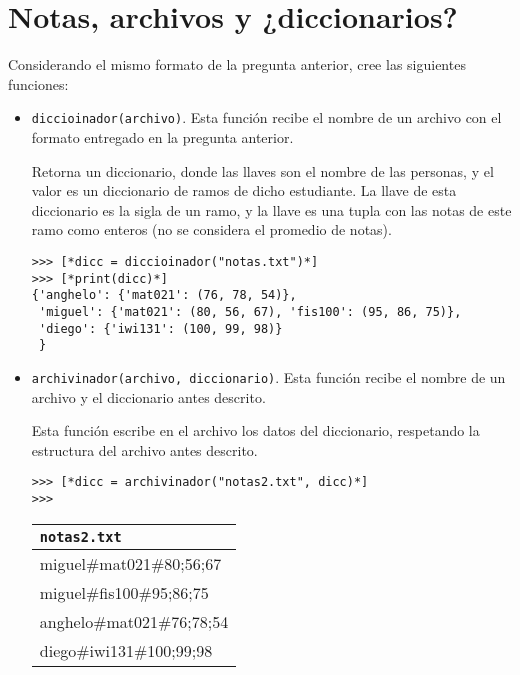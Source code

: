 \section{Notas, archivos y ¿diccionarios?}

Considerando el mismo formato de la pregunta anterior, cree las siguientes funciones:

\begin{itemize}
    \item \texttt{diccioinador(archivo)}. Esta función recibe el nombre de un archivo con el formato entregado en la pregunta anterior. 
    
    Retorna un diccionario, donde las llaves son el nombre de las personas, y el valor es un diccionario de ramos de dicho estudiante. La llave de esta diccionario es la sigla de un ramo, y la llave es una tupla con las notas de este ramo como enteros (no se considera el promedio de notas).
    
    \begin{lstlisting}[style=consola]
>>> [*dicc = diccioinador("notas.txt")*]
>>> [*print(dicc)*]
{'anghelo': {'mat021': (76, 78, 54)}, 
 'miguel': {'mat021': (80, 56, 67), 'fis100': (95, 86, 75)}, 
 'diego': {'iwi131': (100, 99, 98)}
 }
    \end{lstlisting}
    
    \item \texttt{archivinador(archivo, diccionario)}. Esta función recibe el nombre de un archivo y el diccionario antes descrito. 
    
    Esta función escribe en el archivo los datos del diccionario, respetando la estructura del archivo antes descrito.
    
    \begin{lstlisting}[style=consola]
>>> [*dicc = archivinador("notas2.txt", dicc)*]
>>> 
    \end{lstlisting}
    
\begin{center}
\begin{tabular}{|l|}
    \hline
    \texttt{notas2.txt} \\ 
    \hline
    miguel\#mat021\#80;56;67 \\
    miguel\#fis100\#95;86;75 \\
    anghelo\#mat021\#76;78;54 \\
    diego\#iwi131\#100;99;98 \\
    \hline
\end{tabular}
\end{center}
    

\end{itemize}
